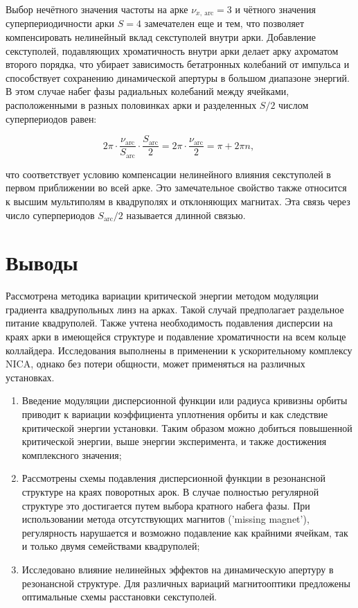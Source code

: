 \par Выбор нечётного значения частоты на арке $\nu_{x,\ \text{arc}}=3$ и чётного значения суперпериодичности арки $S=4$ замечателен еще и тем, что позволяет компенсировать нелинейный вклад секступолей внутри арки. Добавление секступолей, подавляющих хроматичность внутри арки делает арку ахроматом второго порядка, что убирает зависимость бетатронных колебаний от импульса и способствует сохранению динамической апертуры в большом диапазоне энергий. В этом случае набег фазы радиальных колебаний между ячейками, расположенными в разных половинках арки и разделенных $S/2$ числом суперпериодов равен:

\begin{equation}
2\pi\cdot\frac{\nu_{\text{arc}}}{S_{\text{arc}}}\cdot\frac{S_{\text{arc}}}{2}=2\pi\cdot\frac{\nu_{\text{arc}}}{2}=\pi+2\pi n,\
\label{eq:chrom_period}
\end{equation}

\noindent что соответствует условию компенсации нелинейного влияния секступолей в первом приближении во всей арке. Это замечательное свойство также относится к высшим мультиполям в квадруполях и отклоняющих магнитах. Эта связь через число суперпериодов $S_{\text{arc}}/2$ называется длинной связью.

\section*{Выводы}
\par Рассмотрена методика вариации критической энергии методом модуляции градиента квадрупольных линз на арках. Такой случай предполагает раздельное питание квадруполей. Также учтена необходимость подавления дисперсии на краях арки в имеющейся структуре и подавление хроматичности на всем кольце коллайдера. Исследования выполнены в применении к ускорительному комплексу NICA, однако без потери общности, может применяться на различных установках.

\begin{enumerate}

\item Введение модуляции дисперсионной функции или радиуса кривизны орбиты приводит к вариации коэффициента уплотнения орбиты и как следствие критической энергии установки. Таким образом можно добиться повышенной критической энергии, выше энергии эксперимента, и также достижения комплексного значения;

\item Рассмотрены схемы подавления дисперсионной функции в резонансной структуре на краях поворотных арок. В случае полностью регулярной структуре это достигается путем выбора кратного набега фазы. При использовании метода отсутствующих магнитов ('missing magnet'), регулярность нарушается и возможно подавление как крайними ячейкам, так и только двумя семействами квадруполей;

\item Исследовано влияние нелинейных эффектов на динамическую апертуру в резонансной структуре. Для различных вариаций магнитооптики предложены оптимальные схемы расстановки секступолей.

\end{enumerate}

\FloatBarrier